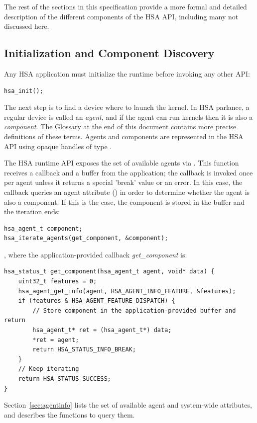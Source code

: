 \documentclass[final]{book}
\begin{document}
The rest of the sections in this specification provide a more formal and
detailed description of the different components of the HSA API, including many
not discussed here.

\subsection{Initialization and Component Discovery}
Any HSA application must initialize the runtime before invoking any other API:
\begin{lstlisting}
hsa_init();
\end{lstlisting}
The next step is to find a device where to launch the kernel. In HSA parlance, a
regular device is called an \emph{agent}, and if the agent can run kernels then
it is also a \emph{component}. The Glossary at the end of this document contains
more precise definitions of these terms. Agents and components are represented
in the HSA API using opaque handles of type .

The HSA runtime API exposes the set of available agents via
. This function receives a callback and a buffer from
the application; the callback is invoked once per agent unless it returns a
special 'break' value or an error. In this case, the callback queries an agent
attribute () in order to determine whether the
agent is also a component. If this is the case, the component is stored in the
buffer and the iteration ends:

\begin{lstlisting}
hsa_agent_t component;
hsa_iterate_agents(get_component, &component);
\end{lstlisting}
, where the application-provided callback \textit{get_component} is:
\begin{lstlisting}
hsa_status_t get_component(hsa_agent_t agent, void* data) {
    uint32_t features = 0;
    hsa_agent_get_info(agent, HSA_AGENT_INFO_FEATURE, &features);
    if (features & HSA_AGENT_FEATURE_DISPATCH) {
        // Store component in the application-provided buffer and return
        hsa_agent_t* ret = (hsa_agent_t*) data;
        *ret = agent;
        return HSA_STATUS_INFO_BREAK;
    }
    // Keep iterating
    return HSA_STATUS_SUCCESS;
}
\end{lstlisting}

Section~\ref{sec:agentinfo} lists the set of available agent and
system-wide attributes, and describes the functions to query them.
\end{document}
